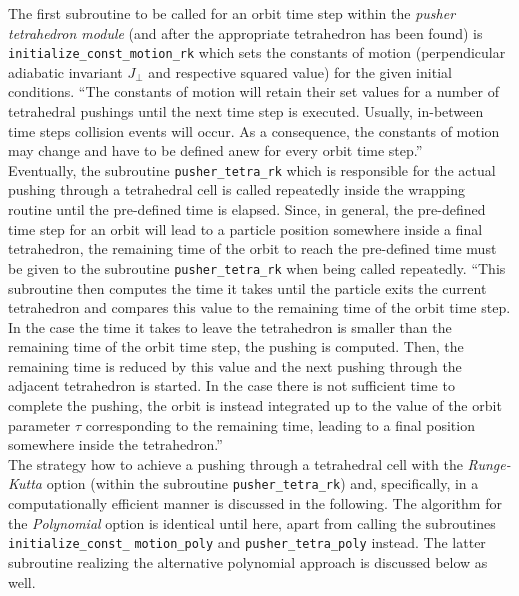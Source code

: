 \documentclass{TheMartianReport}
\begin{document}
%
The first subroutine to be called for an orbit time step within the \textit{pusher tetrahedron module} (and after the appropriate tetrahedron has been found) is \linebreak \texttt{initialize\_const\_motion\_rk} which sets the constants of motion (perpendicular adiabatic invariant $J_\perp$ and respective squared value) for the given initial conditions.
``The constants of motion will retain their set values for a number of tetrahedral pushings until the next time step is executed. Usually, in-between time steps collision events will occur. As a consequence, the constants of motion may change and have to be defined anew for every orbit time step.''\cite{bauer_master_2020} \\
%
Eventually,  the subroutine \texttt{pusher\_tetra\_rk} which is responsible for the actual pushing through a tetrahedral cell is called repeatedly inside the wrapping routine until the pre-defined time is elapsed.  Since, in general, the pre-defined time step for an orbit will lead to a particle position somewhere inside a final tetrahedron, the remaining time of the orbit to reach the pre-defined time must be given to the subroutine \texttt{pusher\_tetra\_rk} when being called repeatedly. ``This subroutine then computes the time it takes until the particle exits the current tetrahedron and compares this value to the remaining time of the orbit time step.  In the case the time it takes to leave the tetrahedron is smaller than the remaining time of the orbit time step, the pushing is computed. Then, the remaining time is reduced by this value and the next pushing through the adjacent tetrahedron is started. In the case there is not sufficient time to complete the pushing, the orbit is instead integrated up to the value of the orbit parameter $\tau$ corresponding to the remaining time, leading to a final position somewhere inside the tetrahedron.''\cite{bauer_master_2020}\\
%
The strategy how to achieve a pushing through a tetrahedral cell with the \textit{Runge-Kutta} option (within the subroutine \texttt{pusher\_tetra\_rk}) and, specifically, in a computationally efficient manner is discussed in the following. The algorithm for the \textit{Polynomial} option is identical until here, apart from calling the subroutines \texttt{initialize\_const\_} \texttt{motion\_poly} and \texttt{pusher\_tetra\_poly} instead.  The latter subroutine realizing the alternative polynomial approach is discussed below as well.
%
\end{document}
